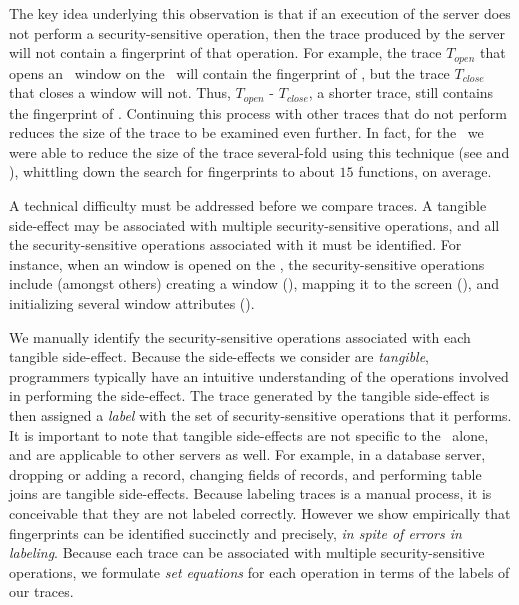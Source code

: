 The key idea underlying this observation is that if an execution of the server
does not perform a security-sensitive operation, then the trace produced by the
server will not contain a fingerprint of that operation.  For example, the
trace $T_{open}$ that opens an \xclient\ window on the \xserver\ will contain
the fingerprint of , but the trace $T_{close}$ that closes a
window will not. Thus, $T_{open}$ - $T_{close}$, a shorter trace, still
contains the fingerprint of . Continuing this process with
other traces that do not perform  reduces the size of the
trace to be examined even further. In fact, for the \xserver\ we were able to
reduce the size of the trace several-fold using this technique (see
 and ), whittling
down the search for fingerprints to about $15$ functions, on average.

A technical difficulty must be addressed before we compare traces. A tangible 
side-effect may be associated with multiple security-sensitive operations, and 
all the security-sensitive operations associated with it must be identified. 
For instance, when an  window is opened on the \xserver, the 
security-sensitive operations include (amongst others) creating a window 
(), mapping it to the screen (), and 
initializing several window attributes ().  

We manually identify the security-sensitive operations associated with each
tangible side-effect.  Because the side-effects we consider are
\textit{tangible}, programmers typically have an intuitive understanding of the
operations involved in performing the side-effect. The trace generated by the
tangible side-effect is then assigned a \textit{label} with the set of
security-sensitive operations that it performs. It is important to note that
tangible side-effects are not specific to the \xserver\ alone, and are
applicable to other servers as well.  For example, in a database server,
dropping or adding a record, changing fields of records, and performing table
joins are tangible side-effects.  Because labeling traces is a manual process,
it is conceivable that they are not labeled correctly. However we show
empirically that fingerprints can be identified succinctly and precisely,
\textit{in spite of errors in labeling}.  Because each trace can be associated
with multiple security-sensitive operations, we formulate
\textit{set equations} for each operation in terms of the labels of our traces.

